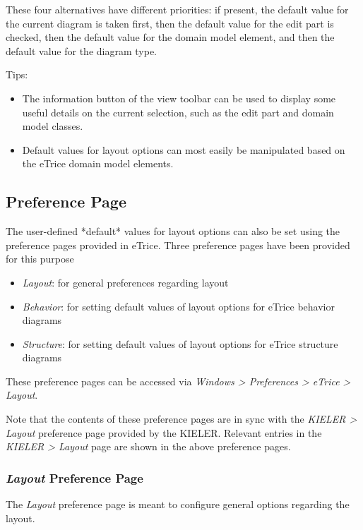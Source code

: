 These four alternatives have different priorities: if present, the default value for the current diagram is taken first, then the default value for the edit part is checked, then the default value for the domain model element, and then the default value for the diagram type.

Tips:
\begin{itemize}
\item The information button of the view toolbar can be used to display some useful details on the current selection, such as the edit part and domain model classes.
\item Default values for layout options can most easily be manipulated based on the eTrice domain model elements.
\end{itemize}

\subsection{\label{preferencePage}Preference Page}

The user-defined *default* values for layout options can also be set using the preference pages provided in eTrice. Three preference pages have been provided for this purpose
\begin{itemize}
\item \textit{Layout}: for general preferences regarding layout
\item \textit{Behavior}: for setting default values of layout options for eTrice behavior diagrams
\item \textit{Structure}: for setting default values of layout options for eTrice structure diagrams
\end{itemize}

These preference pages can be accessed via \textit{Windows > Preferences > eTrice > Layout}.

Note that the contents of these preference pages are in sync with the \textit{KIELER > Layout} preference page provided by the KIELER. Relevant entries in the \textit{KIELER > Layout} page are shown in the above preference pages.

\subsubsection{\textit{Layout} Preference Page}

The \textit{Layout} preference page is meant to configure general options regarding the layout. 

